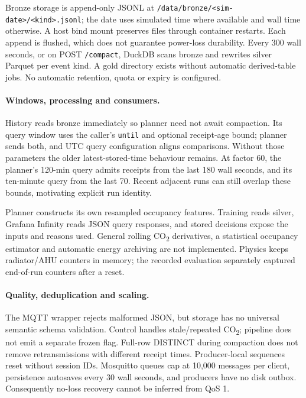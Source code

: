 \documentclass[11pt,a4paper]{article}
\begin{document}
Bronze storage is append-only JSONL at \texttt{/data/bronze/<sim-date>/<kind>.jsonl}; the date uses simulated time where available and wall time otherwise. A host bind mount preserves files through container restarts. Each append is flushed, which does not guarantee power-loss durability. Every 300 wall seconds, or on POST \texttt{/compact}, DuckDB scans bronze and rewrites silver Parquet per event kind. A gold directory exists without automatic derived-table jobs. No automatic retention, quota or expiry is configured.

\paragraph{Windows, processing and consumers.}
History reads bronze immediately so planner need not await compaction. Its query window uses the caller's \texttt{until} and optional receipt-age bound; planner sends both, and UTC query configuration aligns comparisons. Without those parameters the older latest-stored-time behaviour remains. At factor 60, the planner's 120-min query admits receipts from the last 180 wall seconds, and its ten-minute query from the last 70. Recent adjacent runs can still overlap these bounds, motivating explicit run identity.

Planner constructs its own resampled occupancy features. Training reads silver, Grafana Infinity reads JSON query responses, and stored decisions expose the inputs and reasons used. General rolling CO\textsubscript{2} derivatives, a statistical occupancy estimator and automatic energy archiving are not implemented. Physics keeps radiator/AHU counters in memory; the recorded evaluation separately captured end-of-run counters after a reset.

\paragraph{Quality, deduplication and scaling.}
The MQTT wrapper rejects malformed JSON, but storage has no universal semantic schema validation. Control handles stale/repeated CO\textsubscript{2}; pipeline does not emit a separate frozen flag. Full-row DISTINCT during compaction does not remove retransmissions with different receipt times. Producer-local sequences reset without session IDs. Mosquitto queues cap at 10,000 messages per client, persistence autosaves every 30 wall seconds, and producers have no disk outbox. Consequently no-loss recovery cannot be inferred from QoS 1.
\end{document}
